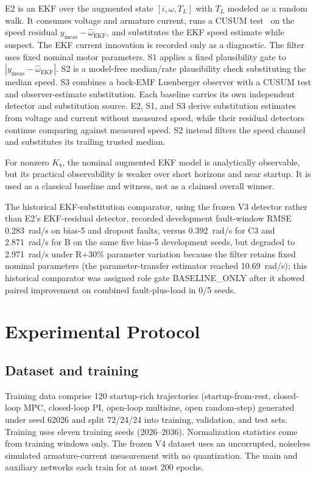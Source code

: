 \documentclass[conference]{IEEEtran}
\begin{document}
E2 is an EKF over the augmented state $[i,\omega,T_L]$ with $T_L$ modeled
as a random walk. It consumes voltage and armature current, runs a CUSUM
test~\cite{Page1954} on the speed residual
$y_{\mathrm{meas}}-\hat{\omega}_{\mathrm{EKF}}$, and substitutes the EKF
speed estimate while suspect. The EKF current innovation is recorded only
as a diagnostic. The filter uses fixed nominal motor
parameters. S1 applies a fixed plausibility gate to $|y_{\text{meas}} -
\hat{\omega}_{\text{EKF}}|$. S2 is a model-free median/rate plausibility
check substituting the median speed. S3 combines a back-EMF Luenberger
observer with a CUSUM test and observer-estimate substitution. Each baseline carries its own independent detector
and substitution source. E2, S1, and S3 derive substitution estimates from
voltage and current without measured speed, while their residual detectors
continue comparing against measured speed. S2 instead filters the speed
channel and substitutes its trailing trusted median.

For nonzero $K_b$, the nominal augmented EKF model is analytically
observable, but its practical observability is weaker over short horizons
and near startup. It is used as a classical baseline and witness, not as a
claimed overall winner.

The historical EKF-substitution comparator, using the frozen V3 detector
rather than E2's EKF-residual detector, recorded development fault-window
RMSE 0.283~rad/s on bias-5 and dropout faults, versus 0.392~rad/s for C3
and 2.871~rad/s for B on the same five bias-5 development seeds,
but degraded to 2.971~rad/s under R+30\% parameter variation because the
filter retains fixed nominal parameters (the parameter-transfer estimator
reached 10.69~rad/s); this historical comparator was assigned role gate
BASELINE\_ONLY after it
showed paired improvement on combined fault-plus-load in 0/5 seeds.

\section{Experimental Protocol}
\label{sec:protocol}

\subsection{Dataset and training}
\label{sec:dataset}

Training data comprise 120 startup-rich trajectories (startup-from-rest,
closed-loop MPC, closed-loop PI, open-loop multisine, open random-step)
generated under seed 62026 and split 72/24/24 into training, validation,
and test sets. Training uses eleven training seeds (2026--2036).
Normalization statistics come from training windows only. The frozen V4
dataset uses an uncorrupted, noiseless simulated armature-current measurement
with no quantization. The main and
auxiliary networks each train for at most 200 epochs.
\end{document}
